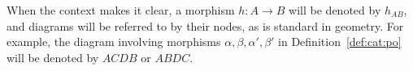\begin{notation}
    When the context makes it clear, a morphism \( h : A \mathop{\to} B \) will be denoted by \( h_{AB} \), and diagrams will be referred to by their nodes, as is standard in geometry. For example, the diagram involving morphisms \( \alpha, \beta, \alpha', \beta' \) in Definition~\ref{def:cat:po} will be denoted by \( ACDB \) or \( ABDC \).
\end{notation}   